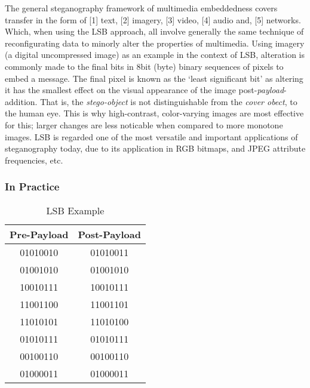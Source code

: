 \documentclass[11pt, english]{article}
\begin{document}
	The general steganography framework of multimedia embeddedness covers transfer in the form of [1] text, [2] imagery, [3] video, [4] audio and, [5] networks. Which, when using the LSB approach, all involve generally the same technique of reconfigurating data to minorly alter the properties of multimedia. Using imagery (a digital uncompressed image) as an example in the context of LSB, alteration is commonly made to the final bits in 8bit (byte) binary sequences of pixels to embed a message. The final pixel is known as the `least significant bit' as altering it has the smallest effect on the visual appearance of the image post-\textit{payload}-addition. That is, the \textit{stego-object} is not distinguishable from the \textit{cover obect}, to the human eye. This is why high-contrast, color-varying images are most effective for this; larger changes are less noticable when compared to more monotone images. LSB is regarded one of the most versatile and important applications of steganography today, due to its application in RGB bitmaps, and JPEG attribute frequencies, etc.

		\subsubsection{In Practice}

	\begin{table}[h]
                \scriptsize
        \begin{center}
        \begin{tabular}{cc}
                \hline
                \textbf{Pre-Payload} & \textbf{Post-Payload}\\
                \hline
                01010010 & 01010011\\
                01001010 & 01001010\\
                10010111 & 10010111\\
                11001100 & 11001101\\
                11010101 & 11010100\\
                01010111 & 01010111\\
                00100110 & 00100110\\
                01000011 & 01000011\\
                \hline
        \end{tabular}
                \caption{LSB Example}
        \end{center}
        \end{table}
\end{document}
